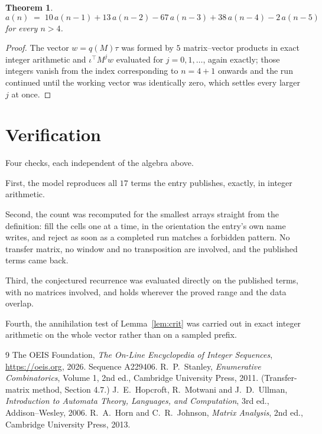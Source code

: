\documentclass[11pt,a4paper]{article}
\theoremstyle{plain}
\newtheorem{theorem}{Theorem}
\theoremstyle{definition}
\begin{document}
\begin{theorem}
\[
a(n)\;=\;10\,a(n-1) + 13\,a(n-2) - 67\,a(n-3) + 38\,a(n-4) - 2\,a(n-5)
\]
for every $n>4$.
\end{theorem}

\begin{proof}
The vector $w=q(M)\tau$ was formed by $5$ matrix--vector products in exact integer
arithmetic and $\iota^{\!\top}M^{j}w$ evaluated for $j=0,1,\dots$, again exactly; those
integers vanish from the index corresponding to $n=4+1$ onwards and the run continued
until the working vector was identically zero, which settles every larger $j$ at once.
\end{proof}

\section{Verification}

Four checks, each independent of the algebra above.

First, the model reproduces all $17$ terms the entry publishes, exactly, in integer
arithmetic.

Second, the count was recomputed for the smallest arrays straight from the definition: fill the
cells one at a time, in the orientation the entry's own name writes, and reject as soon as a
completed run matches a forbidden pattern. No transfer matrix, no window and no transposition
are involved, and the published terms came back.

Third, the conjectured recurrence was evaluated directly on the published terms, with no
matrices involved, and holds wherever the proved range and the data overlap.

Fourth, the annihilation test of Lemma~\ref{lem:crit} was carried out in exact integer
arithmetic on the whole vector rather than on a sampled prefix.

\begin{thebibliography}{9}
 The OEIS Foundation, \emph{The On-Line Encyclopedia of Integer
Sequences}, \url{https://oeis.org}, 2026. Sequence A229406.
 R.~P.~Stanley, \emph{Enumerative Combinatorics}, Volume 1, 2nd ed.,
Cambridge University Press, 2011. (Transfer-matrix method, Section 4.7.)
 J.~E.~Hopcroft, R.~Motwani and J.~D.~Ullman, \emph{Introduction to Automata
Theory, Languages, and Computation}, 3rd ed., Addison--Wesley, 2006.
 R.~A.~Horn and C.~R.~Johnson, \emph{Matrix Analysis}, 2nd ed., Cambridge
University Press, 2013.
\end{thebibliography}
\end{document}
